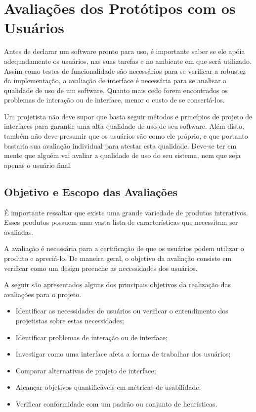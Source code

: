 \chapter[Avaliações dos Protótipos com os Usuários]{Avaliações dos Protótipos com os Usuários}
\label{chap:avaliacaoPrototipos}

	Antes de declarar um software pronto para uso, é importante saber se ele apóia adequadamente os usuários, nas suas tarefas e no ambiente em que será utilizado. Assim como testes de funcionalidade são necessários para se verificar a robustez da implementação, a avaliação de interface é necessária para se analisar a qualidade de uso de um software. Quanto mais cedo forem encontrados os problemas de interação ou de interface, menor o custo de se consertá-los.

	Um projetista não deve supor que basta seguir métodos e princípios de projeto de interfaces para garantir uma alta qualidade de uso de seu software. Além disto, também não deve presumir que os usuários são como ele próprio, e que portanto bastaria sua avaliação individual para atestar esta qualidade. Deve-se ter em mente que alguém vai avaliar a qualidade de uso do seu sistema, nem que seja apenas o usuário final.

	\section[Objetivo e Escopo das Avaliações]{Objetivo e Escopo das Avaliações}
	\label{sec:avaliacaoPrototipos_Objetivo}
		
		É importante ressaltar que existe uma grande variedade de produtos interativos. Esses produtos possuem uma vasta lista de características que necessitam ser avaliadas.
		
		A avaliação é necessária para a certificação de que os usuários podem utilizar o produto e apreciá-lo. De maneira geral, o objetivo da avaliação consiste em verificar como um design preenche as necessidades dos usuários.

		A seguir são apresentados alguns dos principais objetivos da realização das avaliações para o projeto.

		\begin{itemize}
			\item{Identificar as necessidades de usuários ou verificar o entendimento dos projetistas sobre estas necessidades;}
			\item{Identificar problemas de interação ou de interface;}
			\item{Investigar como uma interface afeta a forma de trabalhar dos usuários;}
			\item{Comparar alternativas de projeto de interface;}
			\item{Alcançar objetivos quantificáveis em métricas de usabilidade;}
			\item{Verificar conformidade com um padrão ou conjunto de heurísticas.}
		\end{itemize}


